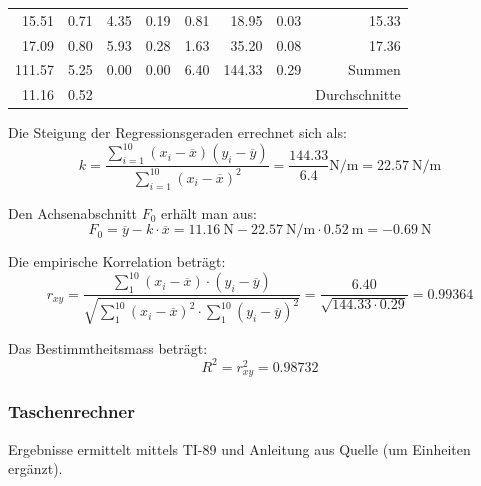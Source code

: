 \begin{tabular}{rrrrrrrr}
              15.51&        0.71&               4.35  &               0.19  &                 0.81                   &        18.95           &         0.03           &  15.33 \\
              17.09&        0.80&               5.93  &               0.28  &                 1.63                   &        35.20           &         0.08           &  17.36 \\
    \midrule
             111.57&        5.25&               0.00  &               0.00  &                 6.40                   &       144.33           &         0.29           & Summen \\
    \midrule
              11.16&        0.52&&&&&& Durchschnitte \\
    \bottomrule
\end{tabular}

Die Steigung der Regressionsgeraden errechnet sich als:
\begin{equation*}
    k = \frac{\sum_{i=1}^{10}(x_i-\overline{x})(y_i-\overline{y})}{\sum_{i=1}^{10}(x_i-\overline{x})^2} = \frac{144.33}{6.4} \si{\newton\per\meter} = \SI{22.57}{\newton\per\meter}
\end{equation*}

Den Achsenabschnitt $F_0$ erh\"alt man aus:
\begin{equation*}
    F_0 = \overline{y} - k \cdot \overline{x} = \SI{11.16}{\newton} - \SI{22.57}{\newton\per\meter} \cdot \SI{0.52}{\meter} = \SI{-0.69}{\newton}
\end{equation*}

Die empirische Korrelation betr\"agt:
\begin{equation*}
    r_{xy} = \frac{\sum_{1}^{10}(x_i - \overline{x}) \cdot (y_i - \overline{y})}{\sqrt{\sum_{1}^{10}(x_i-\overline{x})^2 \cdot \sum_{1}^{10}(y_i-\overline{y})^2}}
           = \frac{6.40}{\sqrt{144.33 \cdot 0.29}} = 0.99364
\end{equation*}

Das Bestimmtheitsmass betr\"agt:
\begin{equation*}
    R^{2} = r_{xy}^2 = 0.98732
\end{equation*}

\subsubsection{Taschenrechner}

Ergebnisse    ermittelt   mittels    TI-89    und    Anleitung   aus    Quelle
\cite{ref:ti89:regression} (um Einheiten erg\"anzt).

